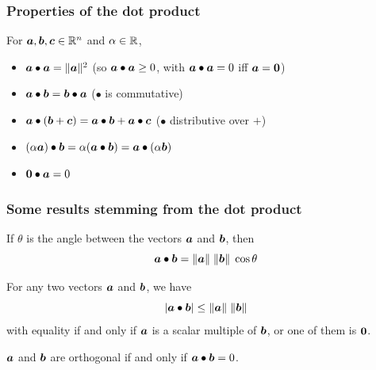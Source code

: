 \documentclass[aspectratio=169]{beamer}\usepackage[]{graphicx}\usepackage[]{xcolor}
\begin{document}
\begin{frame}
\frametitle{Properties of the dot product}
	\begin{theorem}
		For $\bm{a},\bm{b},\bm{c}\in \mathbb{R}^n$ and $\alpha\in\mathbb{R}$,
		\begin{itemize}
			\item $\bm{a}\bullet\bm{a}=\|\bm{a}\|^2$ \hfill (so $\bm{a}\bullet \bm{a}\geq 0$, with $\bm{a}\bullet \bm{a}=0$ iff $\ba=\b0$)
			\item $\bm{a}\bullet \bm{b}=\bm{b}\bullet \bm{a}$ \hfill ($\bullet$ is commutative)
			\item $\bm{a}\bullet(\bm{b}+\bm{c})=\bm{a}\bullet \bm{b}+\bm{a}\bullet \bm{c}$ \hfill ($\bullet$ distributive over $+$)
			\item $(\alpha \bm{a})\bullet \bm{b}=\alpha(\bm{a}\bullet \bm{b})=\bm{a}\bullet(\alpha \bm{b})$
			\item $\b0\bullet \ba=0$
		\end{itemize}
	\end{theorem}
\end{frame}

\begin{frame}
\frametitle{Some results stemming from the dot product}
	\begin{theorem}
		If $\theta$ is the angle between the vectors $\bm{a}$ and $\bm{b}$, then
		\[
		\bm{a}\bullet \bm{b}=\|\bm{a}\|\;\|\bm{b}\|\;\cos\theta
		\]
	\end{theorem}
	\begin{corollary}
		For any two vectors $\bm{a}$ and $\bm{b}$, we have
		\[
		|\bm{a}\bullet \bm{b}|\leq \|\bm{a}\|\;\|\bm{b}\|
		\]
		with equality if and only if $\bm{a}$ is a scalar multiple of $\bm{b}$, or one of them is $\b0$.
	\end{corollary}
	\begin{theorem}
		$\bm{a}$ and $\bm{b}$ are orthogonal if and only if $\bm{a}\bullet \bm{b}=0$.
	\end{theorem}
\end{frame}
\end{document}
